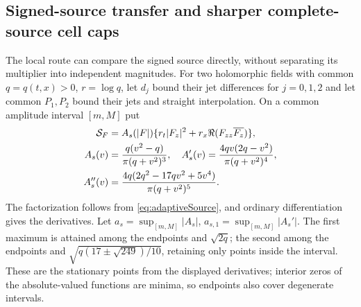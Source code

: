 \subsection{Signed-source transfer and sharper complete-source cell caps}
\label{sec:signed-source}
The local route can compare the signed source directly, without separating
its multiplier into independent magnitudes. For two holomorphic fields
with common $q=q(t,x)>0$, $r=\log q$, let $d_j$ bound their jet differences
for $j=0,1,2$ and let common $P_1,P_2$ bound their jets and straight
interpolation. On a common amplitude interval $[m,M]$ put
\begin{align}
 \mathcal S_F&=A_s(|F|)\{r_t|F_z|^2+r_x\Re(F_{zz}\overline{F_z})\},\notag\\
 A_s(v)&=\frac{q(v^2-q)}{\pi(q+v^2)^3},\quad
 A_s'(v)=\frac{4qv(2q-v^2)}{\pi(q+v^2)^4},\notag\\
 A_s''(v)&=\frac{4q(2q^2-17qv^2+5v^4)}{\pi(q+v^2)^5}.
 \label{eq:signed-radial}
\end{align}
The factorization follows from \eqref{eq:adaptiveSource}, and ordinary
differentiation gives the derivatives. Let $a_s=\sup_{[m,M]}|A_s|$,
$a_{s,1}=\sup_{[m,M]}|A_s'|$. The first maximum is attained among the
endpoints and $\sqrt{2q}$; the second among the endpoints and
$\sqrt{q(17\pm\sqrt{249})/10}$, retaining only points inside the
interval. These are the stationary points from the displayed derivatives;
interior zeros of the absolute-valued functions are minima, so endpoints
also cover degenerate intervals.

